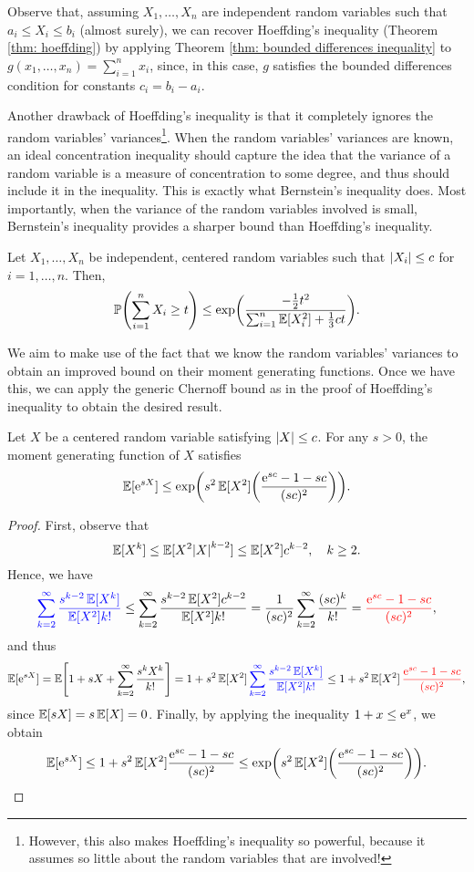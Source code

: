 Observe that, assuming $X_1, \dots, X_n$ are independent random variables such that $a_i \leq X_i \leq b_i$ (almost surely), we can recover Hoeffding's inequality (Theorem \ref{thm: hoeffding}) by applying Theorem \ref{thm: bounded differences inequality} to $g(x_1, \dots, x_n) = \sum_{i=1}^n x_i$, since, in this case, $g$ satisfies the bounded differences condition for constants $c_i = b_i - a_i$.

Another drawback of Hoeffding's inequality is that it completely ignores the random variables' variances\footnote{However, this also makes Hoeffding's inequality so powerful, because it assumes so little about the random variables that are involved!}. When the random variables' variances are known, an ideal concentration inequality should capture the idea that the variance of a random variable is a measure of concentration to some degree, and thus should include it in the inequality. This is exactly what Bernstein's inequality does. Most importantly, when the variance of the random variables involved is small, Bernstein's inequality provides a sharper bound than Hoeffding's inequality.

\begin{theorem}
\label{thm: bernstein}
Let $X_1, \dots, X_n$ be independent, centered random variables such that $\abs{X_i} \leq c$ for $i = 1, \dots, n$. Then,
\[
    \P\left(\sum_{i=1}^n X_i \geq t\right) \leq \exp(\frac{-\frac{1}{2}t^2}{\sum_{i=1}^n \Exp[X_i^2] + \frac{1}{3}ct}).
\]
\end{theorem}

We aim to make use of the fact that we know the random variables' variances to obtain an improved bound on their moment generating functions. Once we have this, we can apply the generic Chernoff bound as in the proof of Hoeffding's inequality to obtain the desired result.

\begin{lemma}
\label{lem: bernstein}
Let $X$ be a centered random variable satisfying $\abs{X} \leq c$. For any $s > 0$, the moment generating function of $X$ satisfies
\[
    \Exp[\e^{sX}] \leq \exp(s^2 \Exp[X^2] \left(\frac{\e^{sc} - 1 - sc}{(sc)^2} \right)).
\]
\end{lemma}

\begin{proof}
First, observe that
\[
    \operatorname{\mathbb{E}}[X^k] \leq \operatorname{\mathbb{E}}[X^2 \abs{X}^{k-2}] \leq \operatorname{\mathbb{E}}[X^2] c^{k-2}, \quad k \geq 2.
\]
Hence, we have
\[
    {\color{blue} \sum_{k=2}^{\infty} \frac{s^{k-2} \operatorname{\mathbb{E}}[X^k]}{\operatorname{\mathbb{E}}[X^2] k!}} \leq \sum_{k=2}^{\infty} \frac{s^{k-2} \operatorname{\mathbb{E}}[X^2] c^{k-2}}{\operatorname{\mathbb{E}}[X^2] k!} = \frac{1}{(sc)^2} \sum_{k=2}^{\infty} \frac{(sc)^k}{k!} = {\color{red} \frac{\mathrm{e}^{sc} - 1 - sc}{(sc)^2}},
\]
and thus
\[
    \Exp[\e^{sX}] = \Exp\left[1 + sX + \sum_{k=2}^{\infty} \frac{s^k X^k}{k!}\right] = 1 + s^2 \Exp[X^2] \, {\color{blue} \sum_{k=2}^{\infty} \frac{s^{k-2} \Exp[X^k]}{\Exp[X^2] k!}} \leq 1 + s^2 \Exp[X^2] \, {\color{red} \frac{\e^{sc} - 1 - sc}{(sc)^2}},
\]
since $\operatorname{\mathbb{E}}[sX] = s \operatorname{\mathbb{E}}[X] = 0$. Finally, by applying the inequality $1 + x \leq \mathrm{e}^x$, we obtain
\[
    \Exp[\e^{sX}] \leq 1 + s^2 \Exp[X^2] \frac{\e^{sc} - 1 - sc}{(sc)^2} \leq \exp(s^2 \Exp[X^2] \left(\frac{\e^{sc} - 1 - sc}{(sc)^2} \right)). \qedhere
\]
\end{proof}

